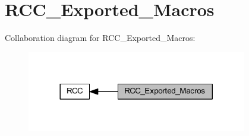 \hypertarget{group___r_c_c___exported___macros}{}\section{R\+C\+C\+\_\+\+Exported\+\_\+\+Macros}
\label{group___r_c_c___exported___macros}
Collaboration diagram for R\+C\+C\+\_\+\+Exported\+\_\+\+Macros\+:
\nopagebreak
\begin{figure}[H]
\begin{center}
\leavevmode
\includegraphics[width=272pt]{group___r_c_c___exported___macros}
\end{center}
\end{figure}
